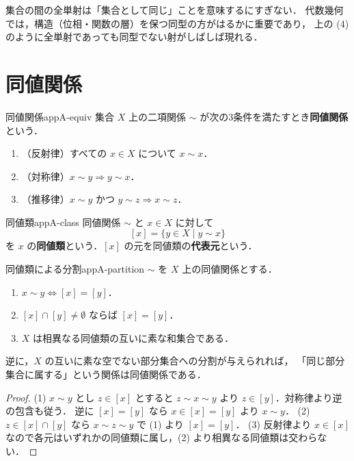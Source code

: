 \begin{note}
集合の間の全単射は「集合として同じ」ことを意味するにすぎない．
代数幾何では，構造（位相・関数の層）を保つ同型の方がはるかに重要であり，
上の (4) のように全単射であっても同型でない射がしばしば現れる．
\end{note}

\section{同値関係}

\begin{mydef}{同値関係}{appA-equiv}
集合 $X$ 上の二項関係 $\sim$ が次の3条件を満たすとき\textbf{同値関係}という．
\begin{enumerate}
\item（反射律）すべての $x\in X$ について $x\sim x$．
\item（対称律）$x\sim y\Rightarrow y\sim x$．
\item（推移律）$x\sim y$ かつ $y\sim z\Rightarrow x\sim z$．
\end{enumerate}
\end{mydef}

\begin{mydef}{同値類}{appA-class}
同値関係 $\sim$ と $x\in X$ に対して
\[
[x]=\{y\in X\mid y\sim x\}
\]
を $x$ の\textbf{同値類}という．$[x]$ の元を同値類の\textbf{代表元}という．
\end{mydef}

\begin{myprop}{同値類による分割}{appA-partition}
$\sim$ を $X$ 上の同値関係とする．
\begin{enumerate}
\item $x\sim y\iff [x]=[y]$．
\item $[x]\cap[y]\ne\emptyset$ ならば $[x]=[y]$．
\item $X$ は相異なる同値類の互いに素な和集合である．
\end{enumerate}
逆に，$X$ の互いに素な空でない部分集合への分割が与えられれば，
「同じ部分集合に属する」という関係は同値関係である．
\end{myprop}
\begin{proof}
(1) $x\sim y$ とし $z\in[x]$ とすると $z\sim x\sim y$ より $z\in[y]$．対称律より逆の包含も従う．
逆に $[x]=[y]$ なら $x\in[x]=[y]$ より $x\sim y$．
(2) $z\in[x]\cap[y]$ なら $x\sim z\sim y$ で (1) より $[x]=[y]$．
(3) 反射律より $x\in[x]$ なので各元はいずれかの同値類に属し，(2) より相異なる同値類は交わらない．
\end{proof}

